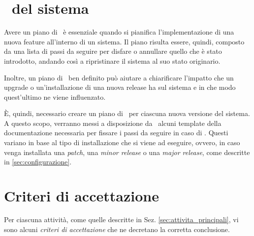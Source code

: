 \section{\rollback~del sistema}


	Avere un piano di \rollback~è essenziale quando si pianifica l'implementazione di una nuova feature all'interno di un sistema.
	Il piano risulta essere, quindi, composto da una lista di passi da seguire per disfare o annullare quello che è stato introdotto, andando così a ripristinare il sistema al suo stato originario.
	
	Inoltre, un piano di \rollback~ben definito può aiutare a chiarificare l'impatto che un upgrade o un'installazione di una nuova release ha sul sistema e in che modo quest'ultimo ne viene influenzato.

	È, quindi, necessario creare un piano di \rollback~per ciascuna nuova versione del sistema.
	A questo scopo, verranno messi a disposizione da \azienda~alcuni template della documentazione necessaria per fissare i passi da seguire in caso di \rollback.
	Questi variano in base al tipo di installazione che si viene ad eseguire, ovvero, in caso venga installata una \textit{patch}, una \textit{minor release} o una \textit{major release}, come descritte in \ref{sec:configurazione}.

\newpage
\section{Criteri di accettazione}

	Per ciascuna attività, come quelle descritte in Sez. \ref{sec:attivita_principali}, vi sono alcuni \textit{criteri di accettazione} che ne decretano la corretta conclusione.

